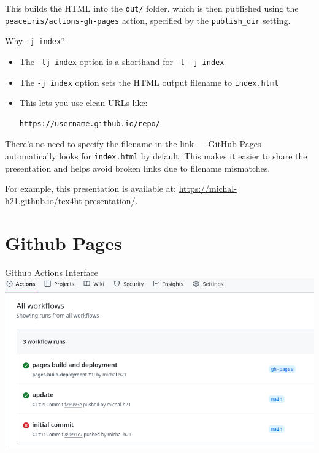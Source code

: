 This builds the HTML into the \texttt{out/} folder, which is then published
using the \texttt{peaceiris/actions-gh-pages} action, specified by the
\texttt{publish\_dir} setting.


\begin{frame}[fragile]{Why \texttt{-j index}?}
\begin{itemize}
  \item The \texttt{-lj index} option is a shorthand for \texttt{-l -j index}
  \item The \texttt{-j index} option sets the HTML output filename to \texttt{index.html}
  \item This lets you use clean URLs like:
  
\begin{verbatim}
https://username.github.io/repo/
\end{verbatim}

\end{itemize}
\end{frame}


There’s no need to specify the filename in the link — GitHub Pages
automatically looks for \texttt{index.html} by default. This makes it easier to share
the presentation and helps avoid broken links due to filename mismatches.

For example, this presentation is available at: \url{https://michal-h21.github.io/tex4ht-presentation/}.

\section{Github Pages}

\begin{frame}[fragile]{Github Actions Interface}
  \includegraphics[width=\textwidth]{img/github-actions.png}
\end{frame}

